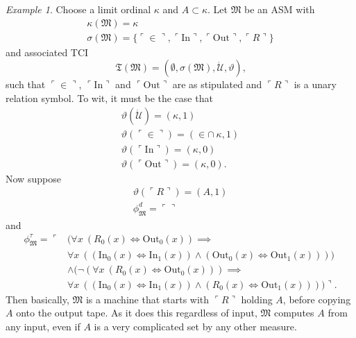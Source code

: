 \documentclass[12pt, twoside]{memoir}
\numberwithin{equation}{section}
\theoremstyle{definition}
\theoremstyle{remark}
\newtheorem{ex}[thm]{Example}
\theoremstyle{definition}
\theoremstyle{definition}
\theoremstyle{definition}
\theoremstyle{remark}
\begin{document}
\begin{ex}\label{ex217}
Choose a limit ordinal $\kappa$ and $A \subset \kappa$. Let $\mathfrak{M}$ be an ASM with 
\begin{gather*}
    \kappa(\mathfrak{M}) = \kappa \\
    \sigma(\mathfrak{M}) = \{\ulcorner \in \urcorner, \ulcorner \mathrm{In} \urcorner, \ulcorner \mathrm{Out} \urcorner, \ulcorner R \urcorner\}
\end{gather*} 
and associated TCI 
\begin{equation*}
    \mathfrak{T}(\mathfrak{M}) = (\emptyset, \sigma(\mathfrak{M}), \dot{\mathcal{U}}, \vartheta) \text{,}
\end{equation*} 
such that $\ulcorner \in \urcorner$, $\ulcorner \mathrm{In} \urcorner$ and $\ulcorner \mathrm{Out} \urcorner$ are as stipulated and $\ulcorner R \urcorner$ is a unary relation symbol. To wit, it must be the case that
\begin{gather*}
    \vartheta(\dot{\mathcal{U}}) = (\kappa, 1) \\
    \vartheta(\ulcorner \in \urcorner) = (\in \cap \ \kappa, 1) \\
    \vartheta(\ulcorner \mathrm{In} \urcorner) = (\kappa, 0) \\
    \vartheta(\ulcorner \mathrm{Out} \urcorner) = (\kappa, 0) \text{.}
\end{gather*}
Now suppose
\begin{gather*}
    \vartheta(\ulcorner R \urcorner) = (A, 1) \\
    \phi^d_{\mathfrak{M}} = \ulcorner \urcorner
\end{gather*}
and
\begin{align*}
    \phi^{\tau}_{\mathfrak{M}} = \ulcorner & (\forall x \ (R_0(x) \iff \mathrm{Out}_0(x)) \implies \\
    & \forall x \ ((\mathrm{In}_0(x) \iff \mathrm{In}_1(x)) \wedge (\mathrm{Out}_0(x) \iff \mathrm{Out}_1(x)))) \\
    & \wedge (\neg (\forall x \ (R_0(x) \iff \mathrm{Out}_0(x))) \implies \\
    & \forall x \ ((\mathrm{In}_0(x) \iff \mathrm{In}_1(x)) \wedge (R_0(x) \iff \mathrm{Out}_1(x)))) \urcorner \text{.}
\end{align*}
Then basically, $\mathfrak{M}$ is a machine that starts with $\ulcorner R \urcorner$ holding $A$, before copying $A$ onto the output tape. As it does this regardless of input, $\mathfrak{M}$ computes $A$ from any input, even if $A$ is a very complicated set by any other measure.
\end{ex}
\end{document}
